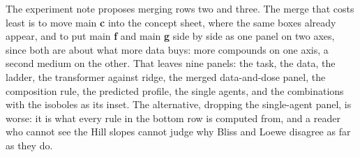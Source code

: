 The experiment note proposes merging rows two
and three. The merge that costs least is to move main \textbf{c} into the concept sheet,
where the same boxes already appear, and to put main \textbf{f} and main \textbf{g} side
by side as one panel on two axes, since both are about what more data buys: more
compounds on one axis, a second medium on the other. That leaves nine panels: the task,
the data, the ladder, the transformer against ridge, the merged data-and-dose panel, the
composition rule, the predicted profile, the single agents, and the combinations with the
isoboles as its inset. The alternative, dropping the single-agent panel, is worse: it is
what every rule in the bottom row is computed from, and a reader who cannot see the Hill
slopes cannot judge why Bliss and Loewe disagree as far as they do.
